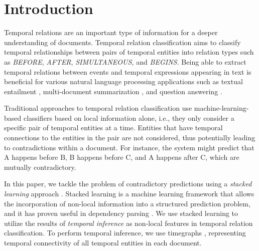 \documentclass[english]{jnlp_1.4}
\begin{document}
\maketitle

\section{Introduction}
\label{sec:intro}
Temporal relations are an important type of information for a deeper understanding of documents.
Temporal relation classification aims to classify temporal relationships between pairs of temporal entities into relation types such as \emph{\footnotesize BEFORE}, \emph{\footnotesize AFTER}, \emph{\footnotesize SIMULTANEOUS,} and \emph{\footnotesize BEGINS.}
\linebreak
Being able to extract temporal relations between events and temporal expressions appearing in text is beneficial for various natural language processing applications such as textual entailment , multi-document summarization \cite{bollegala2006}, and question answering \cite{ravichandran2002}. 

Traditional approaches to temporal relation classification use machine-learning-based classifiers \cite{mani2006} based on local information alone, i.e., they only consider a specific pair of temporal entities at a time.
Entities that have temporal connections to the entities in the pair are not considered, thus potentially leading to contradictions within a document.
For instance, the system might predict that A happens before B, B happens before C, and A happens after C, which are mutually contradictory.

In this paper, we tackle the problem of contradictory predictions using a {\it stacked learning} approach . 
Stacked learning is a machine learning framework that allows the incorporation of non-local information into a structured prediction problem, and it has proven useful in dependency parsing \cite{martins2008}. 
We use stacked learning to utilize the results of {\it temporal inference} as non-local features in temporal relation classification.
To perform temporal inference, we use timegraphs , representing temporal connectivity of all temporal entities in each document.
\end{document}
